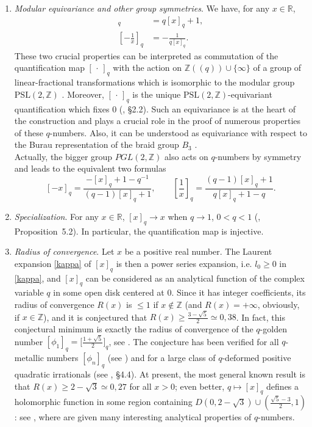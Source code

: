 \documentclass[11pt,reqno]{amsart}
\theoremstyle{plain}
\theoremstyle{definition}
\numberwithin{figure}{section}
\numberwithin{table}{section}
\numberwithin{equation}{section}
\newcommand{\R}{\mathbb{R}}
\newcommand{\Z}{\mathbb{Z}}
\newcommand{\PSL}{\mathrm{PSL}}
\let\fr=\frac
\begin{document}
\begin{enumerate}[wide]
\item \emph{Modular equivariance and other group symmetries}. We have, for any $x\in\R$,
\begin{align}
[x+1]_q&=q[x]_q+1,\label{inv1}\\
 \left[-\fr 1{x}\right]_q&=-\fr 1{q[x]_q}.\label{inv2}
\end{align}
These two crucial properties  can be interpreted as commutation of the quantification map $[\,\cdot\,]_q$  with the action on $\Z(\!(q)\!)\cup\{\infty\}$ of a group of linear-fractional transformations which is isomorphic to the modular group $\PSL(2,\Z)$ \cite{MGO22,LMG21}. Moreover, $[\,\cdot\,]_q$ is the unique $\PSL(2,\Z)$-equivariant quantification which fixes $0$ (\cite{OP25}, §2.2). Such an equivariance is at the heart of the construction and plays a crucial role in the proof of numerous properties of these $q$-numbers. Also, it can  be understood as equivariance with respect to the Burau representation of
the braid group $B_3$ \cite{BBL23,MGOV24}.\\
Actually, the bigger group $PGL(2,\Z)$ also acts on $q$-numbers  by symmetry and leads to the  equivalent two formulas \cite{Jouteur}
\begin{equation}\label{inv3}
[-x]_q=\fr{-[x]_q+1-q^{-1}}{(q-1)[x]_q+1},\qquad 
\left[\fr 1{x}\right]_q=\fr{(q-1)[x]_q+1}{q[x]_q+1-q}.
\end{equation}

\item \emph{Specialization}. For any $x\in\R$, $[x]_q\to x$ when $q\to 1$, $0<q<1$ (\cite{Etingof}, Proposition~5.2). In particular, the quantification map is injective.

\item \emph{Radius of convergence}. Let $x$ be a positive real number. The Laurent expansion \eqref{kappa} of $[x]_q$ is then a power series expansion, i.e. $l_0≥0$ in \eqref{kappa}, and  $[x]_q$ can be considered as an analytical function of the complex variable $q$ in some open disk centered at $0$. Since it has integer coefficients, its radius of convergence $R(x)$ is $≤1$ if $x\notin\Z$ (and $R(x)=+\infty$, obviously, if $x\in\Z$), and it is conjectured that $R(x)≥\fr{3-\sqrt{5}}{2}\simeq 0,38$. In fact, this conjectural minimum is exactly the radius of convergence of  the $q$-golden number $[\phi_1]_q=\bigl[\fr{1+\sqrt{5}}{2}\bigr]_q$, see \cite{LMGOV24}. The conjecture has  been verified for all $q$-metallic numbers $[\phi_n]_q$ (see \cite{Ren22,Ren23}) and for a large class of $q$-deformed positive quadratic irrationals (see \cite{Leclere24}, §4.4). 
At present, the most general known result  is that $R(x)≥2-\sqrt{3}\simeq 0,27$ for all $x>0$; even better, $q\mapsto [x]_q$ defines a holomorphic function in some region containing $D(0,2-\sqrt{3})\cup (\fr{\sqrt{5}-3}{2},1)$: see \cite{Etingof}, where are given many interesting  analytical properties of $q$-numbers.


\end{enumerate}
\end{document}
